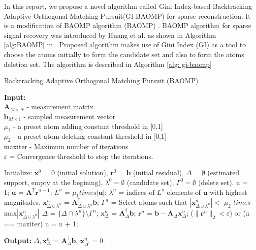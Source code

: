 \documentclass[11pt,conference]{IEEEtran}
\begin{document}
\par In this report, we propose a novel algorithm called Gini Index-based Backtracking Adaptive Orthogonal Matching Pursuit(GI-BAOMP) for sparse reconstruction. It is a modification of BAOMP algorithm (BAOMP) \cite{baomp}. BAOMP algorithm for sparse signal recovery was introduced by Huang et al. as shown in Algorithm \ref{alg:BAOMP} in \cite{baomp}. Proposed algorithm makes use of Gini Index (GI) \cite{GI} as a tool to choose the atoms initially to form the candidate set and also to form the atoms deletion set. The algorithm is described in Algorithm \ref{alg: gi-baomp}

\begin{algorithm}
 \caption{Backtracking Adaptive Orthogonal Matching Pursuit (BAOMP)}
\label{alg:BAOMP} 
{\bf Input:} \\
$\mathbf{A}_{M \times N}$ - measurement matrix\vspace{0.3cm} \\
 $\mathbf{b}_{M \times 1}$ - sampled measurement vector\vspace{0.3cm} \\
 $\mu_1$ - a preset atom adding constant threshold in [0,1]\vspace{0.3cm} \\
 $\mu_2$ - a preset atom deleting constant threshold in [0,1]\vspace{0.3cm} \\
maxiter - Maximum number of iterations\vspace{0.3cm} \\
 $\varepsilon$ = Convergence threshold to stop the iterations. \vspace{0.1cm} \\
\begin{algorithmic}
\State Initialize: $\mathbf{x}^0$ = 0 (initial solution), $\mathbf{r}^0$ = $\mathbf{b}$ (initial residual), $\Delta$ = $\emptyset$ (estimated support, empty at the begining), $\lambda^0 = \emptyset$ (candidate set), $\Gamma^0 = \emptyset$ (delete set).
\Repeat
\State n = 1;
\State $\mathbf{u}$ = $\mathbf{A}^T \mathbf{r}^{n-1}$;
\State $L^n$ = $\mu_1 times |\mathbf{u}|$;
\State $\lambda^n$ = indices of $L^n$ elements of $\mathbf{u}$ with highest magnitudes.
\State $\mathbf{x}^n_{\Delta \cup \lambda^n}$ = $\mathbf{A}^\dagger_{\Delta \cup \lambda^n} \mathbf{b}$;
\State $\Gamma^n$  = Select atoms such that $|\mathbf{x}^n_{\Delta \cup \lambda^n}| <$ $\mu_2$ $times$ max$|\mathbf{x}^n_{\Delta \cup \lambda^n}|$
\State $\Delta$ = $\{\Delta \cap \lambda^n\} \setminus \Gamma^n$;
\State $\mathbf{x}_\Delta^n$ = $\mathbf{A}^\dagger_\Delta \mathbf{b}$;
\State $\mathbf{r}^n$ = $\mathbf{b} - \mathbf{A}_\Delta \mathbf{x}^n_\Delta$;
\Until ($\|\mathbf{r}^n\|_2 < \varepsilon$) or (n == maxiter)
\State n = n + 1; 
\end{algorithmic}
{\bf Output:} $\Delta, \mathbf{x}_\Delta^n$ = $\mathbf{A}^\dagger_\Delta \mathbf{b}$, $\mathbf{x}^n_{\Delta^c} = 0$.
\end{algorithm}
\end{document}
